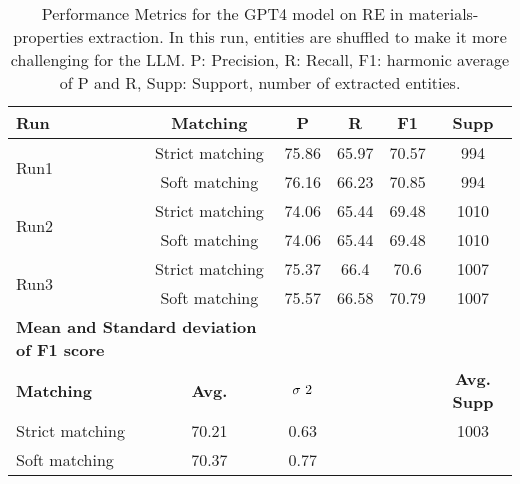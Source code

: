 \begin{table}[htbp]
    \small
    \centering
    \caption{Performance Metrics for the GPT4 model on RE in materials-properties extraction. In this run, entities are shuffled to make it more challenging for the LLM. P: Precision, R: Recall, F1: harmonic average of P and R, Supp: Support, number of extracted entities.}
    \begin{tabular}{lccccc}
        \toprule
        \textbf{Run} & \textbf{Matching} & \textbf{P} & \textbf{R} & \textbf{F1} & \textbf{Supp} \\
        \midrule
        \multirow{2}{*}{Run1} & Strict matching & 75.86 & 65.97 & 70.57 & 994 \\
        & Soft matching & 76.16 & 66.23 & 70.85 & 994 \\
        \midrule
        \multirow{2}{*}{Run2} & Strict matching & 74.06 & 65.44 & 69.48 & 1010 \\
        & Soft matching & 74.06 & 65.44 & 69.48 & 1010 \\
        \midrule
        \multirow{2}{*}{Run3} & Strict matching & 75.37 & 66.4 & 70.6 & 1007 \\
        & Soft matching & 75.57 & 66.58 & 70.79 & 1007 \\
        \midrule
        \multicolumn{2}{l}{\textbf{Mean and Standard deviation of F1 score}} & & & & \\
        \midrule
        \textbf{Matching} & \textbf{Avg.} & $\sigma\textsuperscript{2}$ & & & \textbf{Avg. Supp}\\
        Strict matching & 70.21 & 0.63 & & & 1003 \\
        Soft matching   & 70.37 & 0.77 & & \\
        \bottomrule
    \end{tabular}
\end{table}


